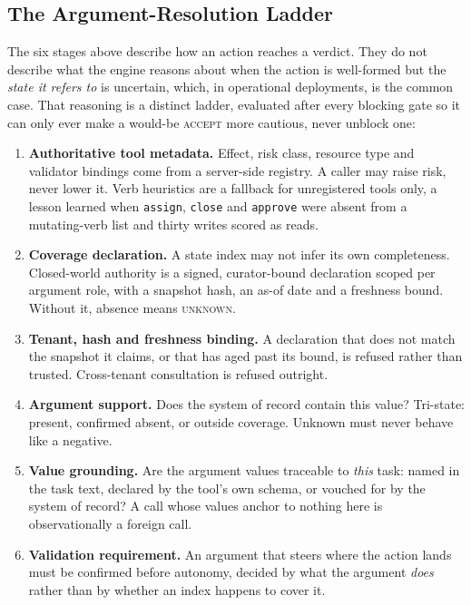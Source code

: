 \documentclass[10pt,twocolumn]{article}
\begin{document}
\subsection{The Argument-Resolution Ladder}
\label{sec:resolution-ladder}

The six stages above describe how an action reaches a verdict. They do not
describe what the engine reasons about when the action is well-formed but the
\emph{state it refers to} is uncertain, which, in operational deployments,
is the common case. That reasoning is a distinct ladder, evaluated after every
blocking gate so it can only ever make a would-be \textsc{accept} more
cautious, never unblock one:

\begin{enumerate}\setlength{\itemsep}{1pt}
\item \textbf{Authoritative tool metadata.} Effect, risk class, resource type
  and validator bindings come from a server-side registry. A caller may raise
  risk, never lower it. Verb heuristics are a fallback for unregistered tools
  only, a lesson learned when \texttt{assign}, \texttt{close} and
  \texttt{approve} were absent from a mutating-verb list and thirty writes
  scored as reads.
\item \textbf{Coverage declaration.} A state index may not infer its own
  completeness. Closed-world authority is a signed, curator-bound declaration
  scoped per argument role, with a snapshot hash, an as-of date and a
  freshness bound. Without it, absence means \textsc{unknown}.
\item \textbf{Tenant, hash and freshness binding.} A declaration that does not
  match the snapshot it claims, or that has aged past its bound, is refused
  rather than trusted. Cross-tenant consultation is refused outright.
\item \textbf{Argument support.} Does the system of record contain this value?
  Tri-state: present, confirmed absent, or outside coverage. Unknown must
  never behave like a negative.
\item \textbf{Value grounding.} Are the argument values traceable to
  \emph{this} task: named in the task text, declared by the tool's own
  schema, or vouched for by the system of record? A call whose values anchor
  to nothing here is observationally a foreign call.
\item \textbf{Validation requirement.} An argument that steers where the action
  lands must be confirmed before autonomy, decided by what the argument
  \emph{does} rather than by whether an index happens to cover it.

\end{enumerate}
\end{document}

